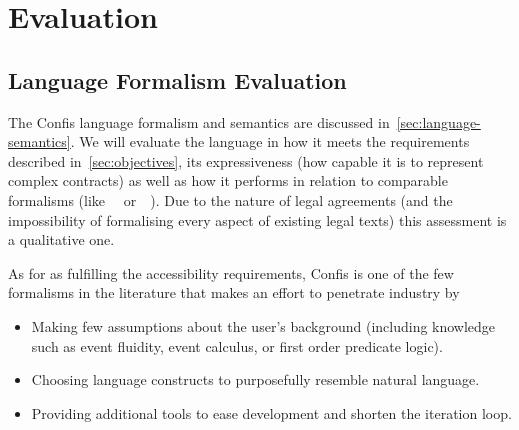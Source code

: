 
\chapter{Evaluation}\label{ch:evaluation}


\section{Language Formalism Evaluation}\label{sec:language-formalism-evaluation}









%

The Confis language formalism and semantics are discussed in~\autoref{sec:language-semantics}.
We will evaluate the language in how it meets the requirements described in~\autoref{sec:objectives}, its expressiveness (how capable it is to represent complex contracts) as well as how it performs in relation to comparable formalisms (like~~\cite{symboleo2020} or~~\cite{accordHomepage}).
Due to the nature of legal agreements (and the impossibility of formalising every aspect of existing legal texts) this assessment is a qualitative one.

As for as fulfilling the accessibility requirements, Confis is one of the few formalisms in the literature that makes an effort to penetrate industry by
\begin{itemize}
    \item Making few assumptions about the user's background (including knowledge such as event fluidity, event calculus, or first order predicate logic).
    \item Choosing language constructs to purposefully resemble natural language.
    \item Providing additional tools to ease development and shorten the iteration loop.
\end{itemize}

